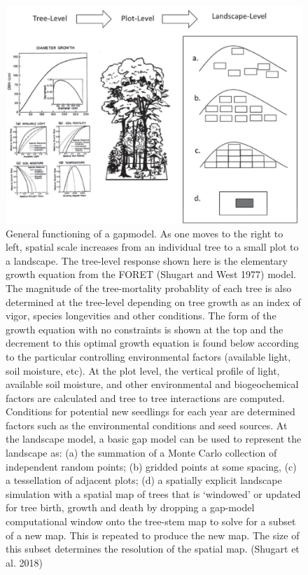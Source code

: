 \documentclass[12pt,oneside]{book}
\begin{document}
\begin{figure}

{\centering \includegraphics[width=0.8\linewidth]{figures/chap6/f611_gap_upscaling_shurgart} 

}

\caption{General functioning of a gapmodel. As one moves to the right to left, spatial scale increases from an individual tree to a small plot to a landscape. The tree-level response shown here is the elementary growth equation from the FORET (Shugart and West 1977) model. The magnitude of the tree-mortality probablity of each tree is also determined at the tree-level depending on tree growth as an index of vigor, species longevities and other conditions. The form of the growth equation with no constraints is shown at the top and the decrement to this optimal growth equation is found below according to the particular controlling environmental factors (available light, soil moisture, etc). At the plot level, the vertical profile of light, available soil moisture, and other environmental and biogeochemical factors are calculated and tree to tree interactions are computed. Conditions for potential new seedlings for each year are determined factors such as the environmental conditions and seed sources. At the landscape model, a basic gap model can be used to represent the landscape as: (a) the summation of a Monte Carlo collection of independent random points; (b) gridded points at some spacing, (c) a tessellation of adjacent plots; (d) a spatially explicit landscape simulation with a spatial map of trees that is ‘windowed’ or updated for tree birth, growth and death by dropping a gap-model computational window onto the tree-stem map to solve for a subset of a new map. This is repeated to produce the new map. The size of this subset determines the resolution of the spatial map. (Shugart et al. 2018)}\label{fig:f611}
\end{figure}
\end{document}

